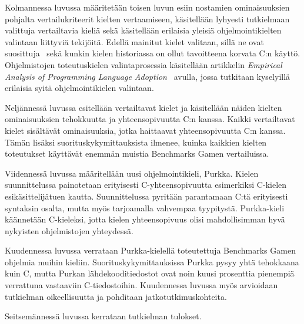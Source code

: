 Kolmannessa luvussa määritetään toisen luvun esiin nostamien ominaisuuksien
pohjalta vertailukriteerit kielten vertaamiseen, käsitellään lyhyesti
tutkielmaan valittuja vertailtavia kieliä sekä käsitellään erilaisia yleisiä
ohjelmointikielten valintaan liittyviä tekijöitä. Edellä mainitut kielet
valitaan, sillä ne ovat suosittuja~\citep{tiobe} sekä kunkin kielen historiassa
on ollut tavoitteena korvata C:n käyttö. Ohjelmistojen toteutuskielen
valintaprosessia käsitellään artikkelin \emph{Empirical Analysis of Programming
Language Adoption}~\citep{empiricalpopularity} avulla, jossa tutkitaan
kyselyillä erilaisia syitä ohjelmointikielen valintaan.

Neljännessä luvussa esitellään vertailtavat kielet ja käsitellään näiden
kielten ominaisuuksien tehokkuutta ja yhteensopivuutta C:n kanssa. Kaikki
vertailtavat kielet sisältävät ominaisuuksia, jotka haittaavat yhteensopivuutta
C:n kanssa. Tämän lisäksi suorituskykymittauksista ilmenee, kuinka kaikkien
kielten toteutukset käyttävät enemmän muistia Benchmarks Gamen vertailuissa.

Viidennessä luvussa määritellään uusi ohjelmointikieli, Purkka. Kielen
suunnittelussa painotetaan erityisesti C-yhteensopivuutta esimerkiksi C-kielen
esikäsittelijätuen kautta. Suunnittelussa pyritään parantamaan C:tä erityisesti
syntaksin osalta, mutta myös tarjoamalla vahvempaa tyypitystä. Purkka-kieli
käännetään C-kieleksi, jotta kielen yhteensopivuus olisi mahdollisimman hyvä
nykyisten ohjelmistojen yhteydessä.

Kuudennessa luvussa verrataan Purkka-kielellä toteutettuja Benchmarks Gamen
ohjelmia muihin kieliin. Suorituskykymittauksissa Purkka pysyy yhtä tehokkaana
kuin C, mutta Purkan lähdekooditiedostot ovat noin kuusi prosenttia pienempiä
verrattuna vastaaviin C-tiedostoihin. Kuudennessa luvussa myös arvioidaan
tutkielman oikeellisuutta ja pohditaan jatkotutkimuskohteita.

Seitsemännessä luvussa kerrataan tutkielman tulokset.
